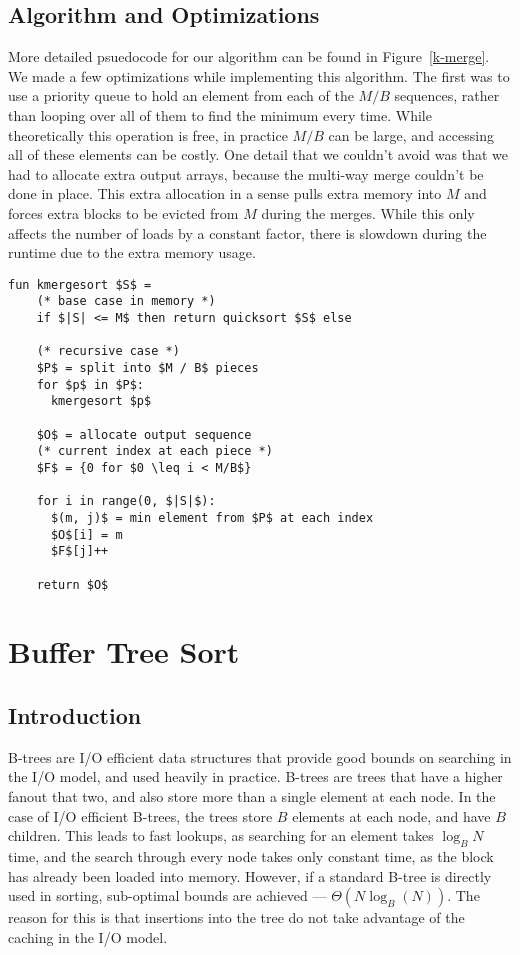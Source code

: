 \documentclass{article}
\begin{document}
\subsection{Algorithm and Optimizations}
More detailed psuedocode for our algorithm can be found in Figure~\ref{k-merge}.
%
We made a few optimizations while implementing this algorithm.
%
The first was to use a priority queue to hold an element from
each of the $M/B$ sequences, rather than looping over
all of them to find the minimum every time.
%
While theoretically this operation is free, in practice $M/B$ can be large,
and accessing all of these elements can be costly.
%
One detail that we couldn't avoid was that we had to allocate extra output
arrays, because the multi-way merge couldn't be done in place.
%
This extra allocation in a sense pulls extra memory into $M$ and forces extra
blocks to be evicted from $M$ during the merges.
%
While this only affects the number of loads by a constant factor,
there is slowdown during the runtime due to the extra memory usage.

\begin{figure*}
\begin{lstlisting}[mathescape=true]
  fun kmergesort $S$ =
    (* base case in memory *)
    if $|S| <= M$ then return quicksort $S$ else

    (* recursive case *)
    $P$ = split into $M / B$ pieces
    for $p$ in $P$:
      kmergesort $p$

    $O$ = allocate output sequence
    (* current index at each piece *)
    $F$ = {0 for $0 \leq i < M/B$}

    for i in range(0, $|S|$):
      $(m, j)$ = min element from $P$ at each index
      $O$[i] = m
      $F$[j]++

    return $O$
\end{lstlisting}
\caption{K-way Mergesort Psuedocode}
\label{k-merge}
\end{figure*}


\section{Buffer Tree Sort}

\subsection{Introduction}

B-trees are I/O efficient data structures that provide good
bounds on searching in the I/O model, and used heavily in practice.
%
B-trees are trees that have a higher fanout that two,
and also store more than a single element at each node.
%
In the case of I/O efficient B-trees, the trees store
$B$ elements at each node, and have $B$ children.
%
This leads to fast lookups, as searching for an element
takes $\log_B N$ time, and the search through every
node takes only constant time, as the block has already
been loaded into memory.
%
However, if a standard B-tree is directly used in
sorting, sub-optimal bounds are achieved --- $\Theta(N\log_B(N))$.
%
The reason for this is that insertions into the tree do not take
advantage of the caching in the I/O model.
\end{document}
